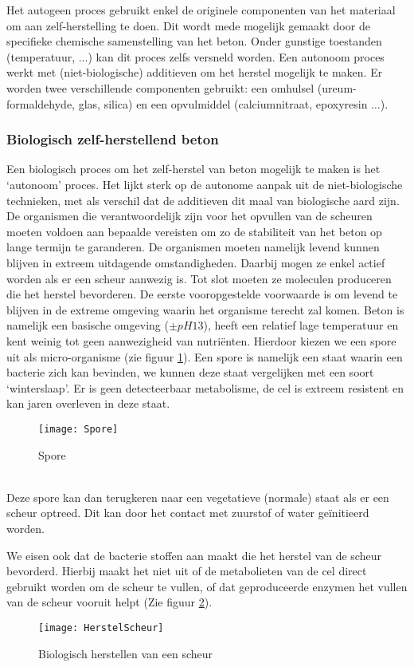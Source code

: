 \documentclass[a4paper,kul]{kulakarticle} %
\begin{document}
Het autogeen proces gebruikt enkel de originele componenten van het materiaal om aan zelf-herstelling te doen. Dit wordt mede mogelijk gemaakt door de specifieke chemische samenstelling van het beton. Onder gunstige toestanden (temperatuur, $\ldots$) kan dit proces zelfs versneld worden. Een autonoom proces werkt met (niet-biologische) additieven om het herstel mogelijk te maken. Er worden twee verschillende componenten gebruikt: een omhulsel (ureum-formaldehyde, glas, silica) en een opvulmiddel (calciumnitraat, epoxyresin $\ldots$).
\subsubsection{Biologisch zelf-herstellend beton}
Een biologisch proces om het zelf-herstel van beton mogelijk te maken is het `autonoom' proces. Het lijkt sterk op de autonome aanpak uit de niet-biologische technieken, met als verschil dat de additieven dit maal van biologische aard zijn. \\

De organismen die verantwoordelijk zijn voor het opvullen van de scheuren moeten voldoen aan bepaalde vereisten om zo de stabiliteit van het beton op lange termijn te garanderen. De organismen moeten namelijk levend kunnen blijven in extreem uitdagende omstandigheden. Daarbij mogen ze enkel actief worden als er een scheur aanwezig is. Tot slot moeten ze moleculen produceren die het herstel bevorderen. 
\newpage
De eerste vooropgestelde voorwaarde is om levend te blijven in de extreme omgeving waarin het organisme terecht zal komen. Beton is namelijk een basische omgeving ($\pm pH 13$), heeft een relatief lage temperatuur en kent weinig tot geen aanwezigheid van nutriënten. Hierdoor kiezen we een spore uit als micro-organisme (zie figuur \ref{fig:spore}). Een spore is namelijk een staat waarin een bacterie zich kan bevinden, we kunnen deze staat vergelijken met een soort `winterslaap'. Er is geen detecteerbaar metabolisme, de cel is extreem resistent en kan jaren overleven in deze staat. 
\begin{figure}[h]
	\centering
	\texttt{[image: Spore]}
	\caption[Spore]{Spore}
	\label{fig:spore}
\end{figure}\\
Deze spore kan dan terugkeren naar een vegetatieve (normale) staat als er een scheur optreed. Dit kan door het contact met zuurstof of water geïnitieerd  worden.

We eisen ook dat de bacterie stoffen aan maakt die het herstel van de scheur bevorderd. Hierbij maakt het niet uit of de metabolieten van de cel direct gebruikt worden om de scheur te vullen, of dat geproduceerde enzymen het vullen van de scheur vooruit helpt (Zie figuur \ref{fig:herstelscheur}).
\begin{figure}[h]
	\centering
	\texttt{[image: HerstelScheur]}
	\caption[Biologisch herstellen scheur]{Biologisch herstellen van een scheur}
	\label{fig:herstelscheur}
\end{figure}
\newpage
\end{document}
